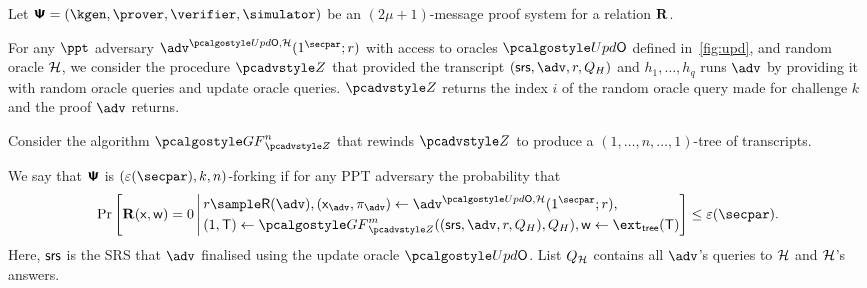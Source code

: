 \begin{definition}
	Let $\proofsystem = (\kgen, \prover, \verifier, \simulator)$ be an
	$(2 \mu + 1)$-message proof system for a relation $\mathbf{R}$.
	
	For any $\ppt$ adversary $\advse^{\initU,
		\ro} (1^\secpar; r)$ with access to oracles $\initU$ defined in~\cref{fig:upd}, and random oracle $\mathcal{H}$, we consider the procedure $\zdv$ that provided the transcript $(\srs, \adv, r, Q_H)$ and $h_1, \ldots, h_q$ runs $\adv$ by providing it with random oracle queries
	and update oracle queries.
	$\zdv$ returns the index $i$ of the
	random oracle query made for challenge $k$ and the proof $\adv$ returns.
	
	Consider the algorithm $\genforking_{\zdv}^{n}$
	that rewinds $\zdv$ to produce a $(1,\dots, n,\dots, 1)$-tree of
	transcripts.
	
	We say that $\bm{\mathsf{\Psi}}$ is $(\eps(\secpar), k,n)$-forking if
	for any PPT adversary the probability that
	\begin{align*}
	\Pr\left[
	\REL(\inp, \wit) = 0
	\,\Biggl|\,
	\begin{aligned}
	& r \sample \RND{\advse},
	(\inp_{\advse}, \zkproof_{\advse}) \gets \advse^{\initU, \ro} (1^\secpar; r), \\
	&    (1, \tree) \gets \genforking_{\zdv}^{m}((\srs,\adv,r, Q_{H}),Q_{H}),
	\wit \gets \extt(\tree)
	\end{aligned}
	\right] \leq \eps(\secpar).
	\end{align*}
	Here, $\mathsf{srs}$ is the SRS that $\advse$ finalised using the update oracle $\initU$.
	List $Q_{\mathcal{H}}$ contains all $\advse$'s
	queries to $\mathcal{H}$ and $\mathcal{H}$'s answers. 
\end{definition}


